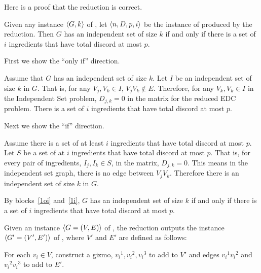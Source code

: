 \documentclass[11pt]{article}
\begin{document}
\begin{problems}
  \medskip 
  Here is a proof that the reduction is correct.
  \begin{lemma}
    Given any instance $\langle G,k \rangle$ of ,
    let $\langle n, D, p, i \rangle$ be the instance of  produced by the reduction.
    Then $G$ has an independent set of size $k$
    if and only if there is a set of $i$ ingredients that have total discord at most $p$.
  \end{lemma}
  \begin{longFormProof}
    \step First we show the ``only if'' direction.
    \begin{block}[1oi]
      {Assume that $G$ has an independent set of size $k$.}
      \step Let $I$ be an independent set of size $k$ in $G$.
      \step That is, for any $V_j, V_k \in I$, $V_jV_k \notin E$.
      \step Therefore, for any $V_k, V_k \in I$ in the Independent Set problem, $D_{j,k} = 0$ in the matrix for the reduced EDC problem.
      \step There is a set of $i$ ingredients that have total discord at most $p$.
    \end{block} 
    \step Next we show the ``if'' direction.
    \begin{block}[1i]
      {Assume there is a set of at least $i$ ingredients that have total discord at most $p$.}
      \step Let $S$ be a set of at $i$ ingredients that have total discord at most $p$.
      \step That is, for every pair of ingredients, $I_j, I_k \in S$, in the matrix, $D_{j,k} = 0$.
      \step This means in the independent set graph, there is no edge between $V_jV_k$.
      \step Therefore there is an independent set of size $k$ in $G$. 
    \end{block} 
    \step By blocks~\ref{1oi} and~\ref{1i},
    $G$ has an independent set of size $k$
    if and only if there is a set of $i$ ingredients that have total discord at most $p$.
  \end{longFormProof}

  \newpage
  \problem %

  Given an instance $\langle G=(V,E) \rangle$ of ,
  the reduction outputs the instance $\langle G'=(V',E') \rangle$ of ,
  where $V'$ and $E'$ are defined as follows:

  \lineacross 
  For each $v_i \in V$, construct a gizmo, ${v_i}^1, {v_i}^2, {v_i}^3$ to add to $V'$ and edges ${v_i}^1{v_i}^2$ and ${v_i}^2{v_i}^3$ to add to $E'$.


\end{problems}
\end{document}
